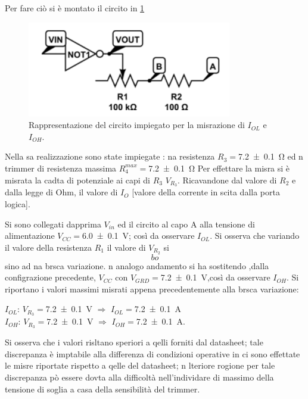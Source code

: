 	Per fare ciò si è montato  il circito in \figurename{ \ref{f:c2} }
	\begin{center}
		\begin{figure}[h]
			\includegraphics[scale=0.75]{cir2.png}
			\caption{Rappresentazione del circito impiegato per la misrazione di $I_{OL}$ e $I_{OH}$. }
			\label{f:c2}
		\end{figure}
	\end{center}
	Nella sa realizzazione sono state impiegate : na resistenza $R_{3}=$\SI{7.2 \pm 0.1}{\ohm} ed n trimmer di resistenza massima $R_{4}^{max}=$\SI{7.2 \pm 0.1}{\ohm}
	Per effettare la misra si è misrata la cadta di potenziale ai capi di $R_{3}$ $V_{R_{3}}$.
	Ricavandone dal valore di $R_{2}$ e dalla legge di Ohm, il valore di $I_{O}$ [valore della corrente in scita dalla porta logica].
	
	Si sono collegati dapprima $V_{in}$ ed il circito al capo A alla tensione di alimentazione $V_{CC}=$\SI{6.0 \pm 0.1}{\volt}; così da osservare $I_{OL}$.
	Si osserva che variando il valore della resistenza $R_{1}$ il
	valore di  $V_{R_{2}}$  si $$bo$$ sino ad na brsca variazione.
	n analogo andamento si ha sostitendo ,dalla configrazione precedente, $V_{CC}$
	con  $V_{GRD}=$\SI{7.2 \pm 0.1}{\volt},così da osservare $I_{OH}$.
	Si riportano i valori massimi misrati appena precedentemente  alla brsca variazione:\\
	\begin{center}
	
	\bigskip
	$I_{OL}$: $V_{R_{3}}=$\SI{7.2 \pm 0.1}{\volt} 
	$\Rightarrow$ $I_{OL}=$\SI{7.2 \pm 0.1}{\ampere}\\

	$I_{OH}$: $V_{R_{3}}=$\SI{7.2 \pm 0.1}{\volt} 
	$\Rightarrow$ $I_{OH}=$\SI{7.2 \pm 0.1}{\ampere}.\\
	\end{center}
	Si osserva che i valori risltano speriori a qelli forniti dal datasheet;
	tale discrepanza è imptabile alla differenza di condizioni operative in ci sono effettate le misre riportate rispetto a qelle del datasheet;
	n lteriore rogione per tale discrepanza pò essere dovta alla difficoltà nell'individare di massimo della tensione di soglia a casa della sensibilità del trimmer. 
	
